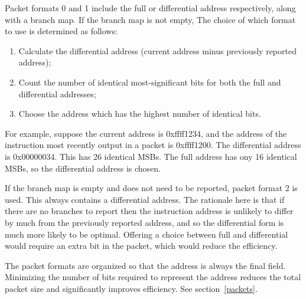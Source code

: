 Packet formats 0 and 1 include the full or differential address respectively, along with a 
branch map.  If the branch map is not empty, The choice of which format to use is determined as follows:

\begin{enumerate}
  \item Calculate the differential address (current address minus previously reported address);
  \item Count the number of identical most-significant bits for both the full and 
    differential addresses;
  \item Choose the address which has the highest number of identical bits.
\end{enumerate}

For example, suppose the current address is 0xffff1234, and the address of the instruction most
recently output in a packet is 0xffff1200.  The differential address is 0x00000034.  This has 
26 identical MSBs.  The full address has ony 16 identical MSBs, so the differential address is
chosen.

If the branch map is empty and does not need to be reported, packet format 2 is used.  This
always contains a differential address.  The rationale here is that if there are no branches to 
report then the instruction address is unlikely to differ by much from the previously reported
address, and so the differential form is much more likely to be optimal.  Offering a choice
between full and differential would require an extra bit in the packet, which would reduce the
efficiency.  

The packet formats are organized so that the address is always the final field.  Minimizing the 
number of bits required to represent the address reduces the total packet size and significantly
improves efficiency.  See section~\ref{packets}.
